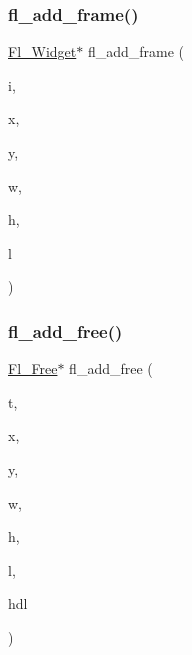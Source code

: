 \subsubsection{\texorpdfstring{fl\+\_\+add\+\_\+frame()}{fl\_add\_frame()}}
{\footnotesize\ttfamily \hyperlink{class_fl___widget}{Fl\+\_\+\+Widget}$\ast$ fl\+\_\+add\+\_\+frame (\begin{DoxyParamCaption}\item[{\hyperlink{_enumerations_8_h_ae48bf9070f8541de17829f54ccacc6bc}{Fl\+\_\+\+Boxtype}}]{i,  }\item[{int}]{x,  }\item[{int}]{y,  }\item[{int}]{w,  }\item[{int}]{h,  }\item[{const char $\ast$}]{l }\end{DoxyParamCaption})\hspace{0.3cm}{\ttfamily [inline]}}

\mbox{\label{forms_8_h_a5805f1fbf5ae20a5b6b53d60daf5f81d}} 
\subsubsection{\texorpdfstring{fl\+\_\+add\+\_\+free()}{fl\_add\_free()}}
{\footnotesize\ttfamily \hyperlink{class_fl___free}{Fl\+\_\+\+Free}$\ast$ fl\+\_\+add\+\_\+free (\begin{DoxyParamCaption}\item[{int}]{t,  }\item[{double}]{x,  }\item[{double}]{y,  }\item[{double}]{w,  }\item[{double}]{h,  }\item[{const char $\ast$}]{l,  }\item[{\hyperlink{_fl___free_8_h_a4bf149c6264cd35972617f05f7e3036b}{F\+L\+\_\+\+H\+A\+N\+D\+L\+E\+P\+TR}}]{hdl }\end{DoxyParamCaption})\hspace{0.3cm}{\ttfamily [inline]}}

\mbox{\label{forms_8_h_ab5b40a8782dd4e56d4ddddb7f536e25d}} 
